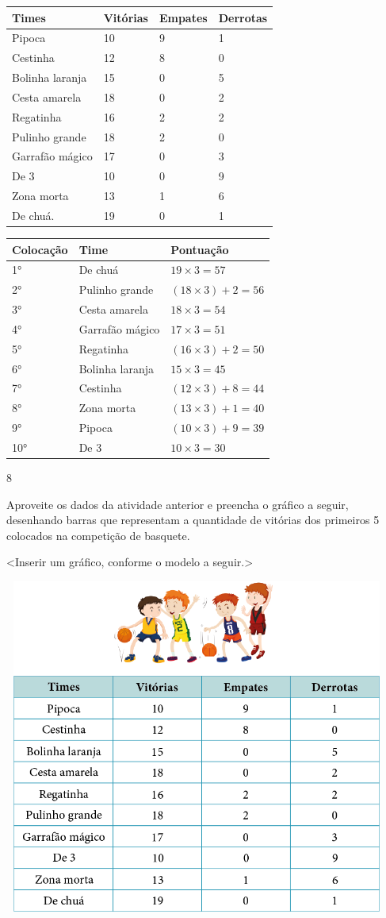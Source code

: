 {{{{{{{{{{{{{{{{{\begin{longtable}[]{@{}llll@{}}
\toprule
Times & Vitórias & Empates & Derrotas\tabularnewline
\midrule
\endhead
Pipoca & 10 & 9 & 1\tabularnewline
Cestinha & 12 & 8 & 0\tabularnewline
Bolinha laranja & 15 & 0 & 5\tabularnewline
Cesta amarela & 18 & 0 & 2\tabularnewline
Regatinha & 16 & 2 & 2\tabularnewline
Pulinho grande & 18 & 2 & 0\tabularnewline
Garrafão mágico & 17 & 0 & 3\tabularnewline
De 3 & 10 & 0 & 9\tabularnewline
Zona morta & 13 & 1 & 6\tabularnewline
De chuá. & 19 & 0 & 1\tabularnewline
\bottomrule
\end{longtable}

\begin{longtable}[]{@{}lll@{}}
\toprule
Colocação & Time & Pontuação\tabularnewline
\midrule
\endhead
1° & De chuá & \(19 \times 3 = 57\ \)\tabularnewline
2° & Pulinho grande &
\(\left( 18 \times 3 \right) + 2 = 56\)\tabularnewline
3° & Cesta amarela & \(18 \times 3 = 54\ \)\tabularnewline
4° & Garrafão mágico & \(17 \times 3 = 51\ \)\tabularnewline
5° & Regatinha & \(\left( 16 \times 3 \right) + 2 = 50\)\tabularnewline
6° & Bolinha laranja & \(15 \times 3 = 45\ \)\tabularnewline
7° & Cestinha & \(\left( 12 \times 3 \right) + 8 = 44\)\tabularnewline
8° & Zona morta & \(\left( 13 \times 3 \right) + 1 = 40\)\tabularnewline
9° & Pipoca & \(\left( 10 \times 3 \right) + 9 = 39\)\tabularnewline
10° & De 3 & \(10 \times 3 = 30\ \)\tabularnewline
\bottomrule
\end{longtable}

\num{8}

Aproveite os dados da atividade anterior e preencha o gráfico a seguir,
desenhando barras que representam a quantidade de vitórias dos primeiros
5 colocados na competição de basquete.

\textless{}Inserir um gráfico, conforme o modelo a seguir.\textgreater{}

\includegraphics[width=5.00000in,height=4.33333in]{media/image94.png}

}}}}}}}}}}}}}}}}}
